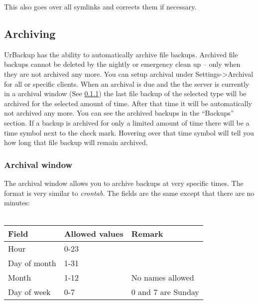 \documentclass[a4paper,10pt]{article}
\begin{document}
\noindent This also goes over all symlinks and corrects them if necessary.

\subsection{Archiving}
\label{subsec:archiving}

UrBackup has the ability to automatically archive file backups. Archived file backups
cannot be deleted by the nightly or emergency clean up -- only when they are not archived
any more. You can setup archival under Settings->Archival for all or specific clients.
When an archival is due and the the server is currently in a archival window (See \ref{subsub:archival_window})
the last file backup of the selected type will be archived for the selected amount of time.
After that time it will be automatically not archived any more. You can see the archived backups
in the ``Backups'' section. If a backup is archived for only a limited amount of time there
will be a time symbol next to the check mark. Hovering over that time symbol will tell you
how long that file backup will remain archived.

\subsubsection{Archival window}
\label{subsub:archival_window}

The archival window allows you to archive backups at very specific times. The format is
very similar to \textsl{crontab}. The fields are the same except that there are no minutes:\\
\\
\begin{tabular}{|l|l|l|}
\hline
Field & Allowed values & Remark\\
\hline \hline
Hour & 0-23 &\\
\hline
Day of month & 1-31& \\
\hline
Month & 1-12 & No names allowed \\
\hline
Day of week & 0-7 & 0 and 7 are Sunday\\
\hline
\end{tabular}\\
\end{document}
